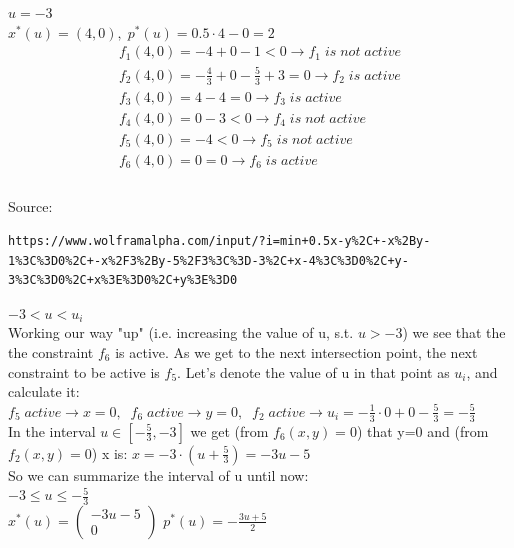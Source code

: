 \documentclass[fleqn]{article}
\begin{document}
\underline{$u=-3$} \\
$x^*(u) = (4,0), \; p^*(u) = 0.5 \cdot 4 -0 = 2$ \\

\begin{multline*}
f_1(4,0) = -4+0-1 < 0 \rightarrow \boxed{f_1 \; is \; not \; active} \\
f_2(4,0) = -\frac{4}{3}+0-\frac{5}{3}+3 = 0 \rightarrow \boxed{f_2 \; is  \; active} \\
f_3(4,0) = 4-4=0 \rightarrow \boxed{f_3 \; is  \; active} \\
f_4(4,0) = 0-3<0 \rightarrow \boxed{f_4 \; is \; not \; active} \\
f_5(4,0) = -4<0 \rightarrow \boxed{f_5 \; is \; not \; active} \\
f_6(4,0) = 0=0 \rightarrow \boxed{f_6 \; is \; active} \\
\end{multline*} \\




Source:
\begin{lstlisting}[breaklines]
https://www.wolframalpha.com/input/?i=min+0.5x-y%2C+-x%2By-1%3C%3D0%2C+-x%2F3%2By-5%2F3%3C%3D-3%2C+x-4%3C%3D0%2C+y-3%3C%3D0%2C+x%3E%3D0%2C+y%3E%3D0
\end{lstlisting}


\underline{$-3<u<u_i$} \\

Working our way "up" (i.e. increasing the value of u, s.t. $u>-3$) we see that the the constraint $f_6$ is active. As we get to the next intersection point, the next constraint to be active is $f_5$. Let's denote the value of u in that point as $u_i$, and calculate it: \\
$f_5 \; active \rightarrow x=0, \;\; f_6 \; active \rightarrow y=0, \;\; f_2 \; active \rightarrow \boxed{u_i = -\frac{1}{3} \cdot 0 + 0 -\frac{5}{3} = -\frac{5}{3}}$ \\
In the interval $u \in [-\frac{5}{3},-3]$ we get (from $f_6(x,y)=0$) that y=0  and (from $f_2(x,y)=0$) x is:
$x = -3 \cdot(u+\frac{5}{3}) = -3u-5$\\

So we can summarize the interval of u until now:\\

\underline{$-3 \leq u \leq -\frac{5}{3}$} \\
$\boxed{x^*(u) = \begin{pmatrix}
           -3u-5 \\
           0 
         \end{pmatrix}}$
$\boxed{p^*(u) = -\frac{3u+5}{2}}$ \\
\end{document}
